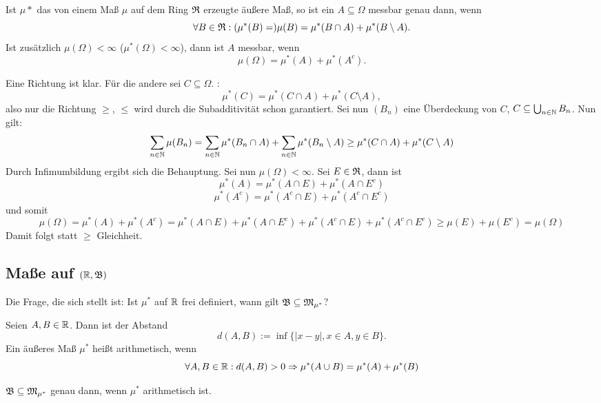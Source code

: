 			\begin{satz}
				Ist $\mu*$ das von einem Maß $\mu$ auf dem Ring $\mathfrak{R}$ erzeugte äußere Maß, so ist ein $A\subseteq \Omega$ messbar genau dann, wenn
				\[ \forall B\in\mathfrak{R}: (\mu^*(B)=)\mu(B)=\mu^*(B\cap A)+\mu^*(B\setminus A). \]
				Ist zusätzlich $\mu(\Omega)<\infty$ ($\mu^*(\Omega)<\infty$), dann ist $A$ messbar, wenn 
				\[ \mu(\Omega)=\mu^*(A)+\mu^*(A^c). \]
			\end{satz}
			
			\begin{bew}
				Eine Richtung ist klar. \newline
				Für die andere sei $C\subseteq \Omega$. \newline
				\zz:
				\[ \mu^*(C)=\mu^*(C\cap A)+\mu^*(C\setminus A), \]
				also nur die Richtung $\ge$, $\le$ wird durch die Subadditivität schon garantiert. Sei nun $(B_n)$ eine Überdeckung von $C$, $C\subseteq \bigcup_{n\in\mathbb{N}} B_n$. Nun gilt:
				\[ \sum_{n\in\mathbb{N}}\mu(B_n)=\sum_{n\in\mathbb{N}} \mu^*(B_n\cap A) + \sum_{n\in\mathbb{N}}\mu^*(B_n\setminus A)\ge \mu^*(C\cap A)+\mu^*(C\setminus A) \]
				Durch Infimumbildung ergibt sich die Behauptung.   \newline
				Sei nun $\mu(\Omega)<\infty$. Sei $E\in\mathfrak{R}$, dann ist
				\[ \mu^*(A)=\mu^*(A\cap E)+\mu^*(A\cap E^c) \]
				\[ \mu^*(A^c)=\mu^*(A^c\cap E)+\mu^*(A^c\cap E^c) \]
				und somit 
				\[ \mu(\Omega)=\mu^*(A)+\mu^*(A^c)=\mu^*(A\cap E)+\mu^*(A\cap E^c)+\mu^*(A^c\cap E)+\mu^*(A^c\cap E^c)\ge \mu(E)+\mu(E^c)=\mu(\Omega) \]
				Damit folgt statt $\ge$ Gleichheit. 
			\end{bew}
			
		\subsection{Maße auf $(\mathbb{R}, \mathfrak{B})$}
			
			Die Frage, die sich stellt ist: Ist $\mu^*$ auf $\mathbb{R}$ frei definiert, wann gilt $\mathfrak{B}\subseteq \mathfrak{M}_{\mu^*}$?
			
			\begin{defi}
				Seien $A,B\in\mathbb{R}$. Dann ist der Abstand 
				\[ d(A,B):=\inf\{|x-y|, x\in A, y\in B\}. \]
				Ein äußeres Maß $\mu^*$ heißt arithmetisch, wenn 
				\[ \forall A,B\in\mathbb{R}: d(A,B)>0\Rightarrow \mu^*(A\cup B)=\mu^*(A)+\mu^*(B) \]
			\end{defi}
			
			\begin{satz} 
				$\mathfrak{B}\subseteq \mathfrak{M}_{\mu^*}$ genau dann, wenn $\mu^*$ arithmetisch ist.
			\end{satz} 
			
